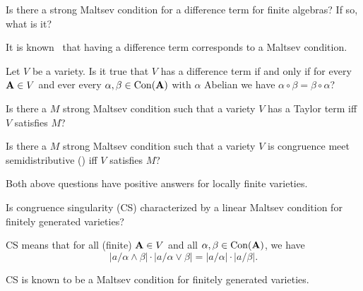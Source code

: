 \begin{question}
  Is there a strong Maltsev condition for a difference term for finite
algebras? If so, what is it?
\end{question}
\begin{context}
  It is known~\cite{kearnes-szendrei-2-commutators} that having a difference term corresponds to a Maltsev condition.
\end{context}

\begin{question}
Let $V$ be a variety. Is it true that $V$ has a difference term if and only if
for every ${\mathbf{A}}\in V$ and ever every $\alpha,\beta\in \operatorname{Con} ({\mathbf{A}})$ with 
$\alpha$ Abelian we have $\alpha\circ\beta=\beta\circ\alpha$?
\end{question}
\begin{question}
  Is there a $M$ strong Maltsev condition such that a variety $V$ has a Taylor
term iff $V$ satisfies $M$?
\end{question}

\begin{question}
  Is there a $M$ strong Maltsev condition such that a variety $V$ is congruence
  meet semidistributive (\SDmeet) iff $V$ satisfies $M$?
\end{question}
\begin{context}
Both above questions have positive answers for locally finite varieties.
\end{context}
\begin{question}
  Is congruence singularity (CS) characterized by a linear Maltsev condition
for finitely generated varieties?
\end{question}
\begin{context}
  CS means that for all (finite) ${\mathbf{A}}\in V$ and all $\alpha,\beta\in \operatorname{Con} ({\mathbf{A}})$, we
have
\[
\left|a/\alpha\wedge \beta \right|\cdot\left|a/\alpha\vee\beta \right|=
 \left|a/\alpha\right|\cdot\left|a/\beta \right|.
\]
 
  CS is known to be a Maltsev condition for finitely generated varieties.
\end{context}


